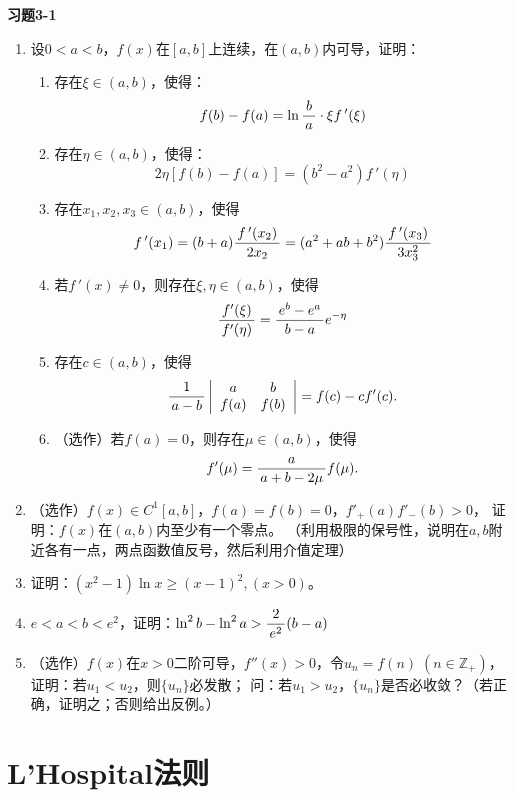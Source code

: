 \begin{ext}
	{\bf 习题3-1}
	
	\begin{enumerate}
	  \item 设$0<a<b$，$f(x)$在$[a,b]$上连续，在$(a,b)$内可导，证明：
		\begin{enumerate}[(1)]
		  \item 存在$\xi\in(a,b)$，使得：
			$$f(b)-f(a)=\ln\displaystyle\frac{\,{b}\,}{\,{a}\,}\cdot \xi f\,'(\xi)$$
		  \item 存在$\eta\in(a,b)$，使得：
		    $$2\eta[f(b)-f(a)]=(b^2-a^2)f\,'(\eta)$$
		  \item 存在$x_1,x_2,x_3\in(a,b)$，使得
			$$f\,'(x_1)=(b+a)\displaystyle\frac{\,{f\,'(x_2)}\,}{\,{2x_2}\,}=(a^2+ab+b^2)
			\displaystyle\frac{\,{f\,'(x_3)}\,}{\,{3x_3^2}\,}$$ 
		  \item 若$f\,'(x)\ne 0$，则存在$\xi,\eta\in(a,b)$，使得
			$$\displaystyle\frac{\,{f'(\xi)}\,}{\,{f'(\eta)}\,}=\displaystyle\frac{\,{e^b-e^a}\,}{\,{b-a}\,}e^{-\eta}$$
		  \item 存在$c\in(a,b)$，使得
			$$\displaystyle\frac{\,{1}\,}{\,{a-b}\,}\left|\begin{array}{cc}
			a & b\\ f(a) & f(b)
			\end{array}\right|=f(c)-cf'(c).$$
		  \item （选作）若$f(a)=0$，则存在$\mu\in(a,b)$，使得
		  $$f'(\mu)=\displaystyle\frac{\,{a}\,}{\,{a+b-2\mu}\,}f(\mu).$$
		\end{enumerate}
	  \item （选作）$f(x)\in C^1[a,b]$，$f(a)=f(b)=0$，$f'_+(a)f'_-(b)>0$，
	  证明：$f(x)$在$(a,b)$内至少有一个零点。
	  （利用极限的保号性，说明在$a,b$附近各有一点，两点函数值反号，然后利用介值定理）
	  \item 证明：$(x^2-1)\ln x\geq(x-1)^2,(x>0)$。
	  \item $e<a<b<e^2$，证明：$\ln^2b-\ln^2a>\displaystyle\frac{\,{2}\,}{\,{e^2}\,}(b-a)$
	  \item （选作）$f(x)$在$x>0$二阶可导，$f''(x)>0$，令$u_n=f(n)\;
	  (n\in\mathbb{Z}_+)$，证明：若$u_1<u_2$，则$\{u_n\}$必发散；
	  问：若$u_1>u_2$，$\{u_n\}$是否必收敛？（若正确，证明之；否则给出反例。）
	\end{enumerate}
\end{ext}

\section{L'Hospital法则}

